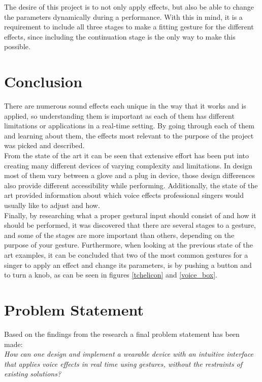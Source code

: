 The desire of this project is to not only apply effects, but also be able to change the parameters dynamically during a performance. With this in mind, it is a requirement to include all three stages to make a fitting gesture for the different effects, since including the continuation stage is the only way to make this possible.


\section{Conclusion}

There are numerous sound effects each unique in the way that it works and is applied, so understanding them is important as each of them has different limitations or applications in a real-time setting.
By going through each of them and learning about them, the effects most relevant to the purpose of the project was picked and described.\\

From the state of the art it can be seen that extensive effort has been put into creating many different devices of varying complexity and limitations. In design most of them vary between a glove and a plug in device, those design differences also provide different accessibility while performing.
Additionally, the state of the art provided information about which voice effects professional singers would usually like to adjust and how.\\

Finally, by researching what a proper gestural input should consist of and how it should be performed, it was discovered that there are several stages to a gesture, and some of the stages are more important than others, depending on the purpose of your gesture.
Furthermore, when looking at the previous state of the art examples, it can be concluded that two of the most common gestures for a singer to apply an effect and change its parameters, is by pushing a button and to turn a knob, as can be seen in figures \ref{tchelicon} and \ref{voice_box}.

\section{Problem Statement}

Based on the findings from the research a final problem statement has been made:\\

\textit{How can one design and implement a wearable device with an intuitive interface that applies voice effects in real time using gestures, without the restraints of existing solutions?}

